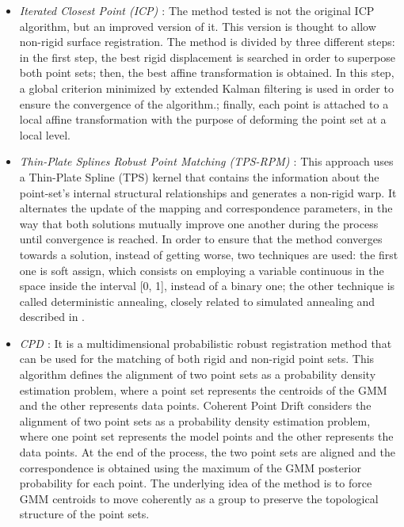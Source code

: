 \begin{itemize}
 \item \textit{Iterated Closest Point (ICP) \citep{besl1992method, feldmar1996rigid}}: The method tested 
is not the original ICP algorithm, but an improved version of it. This version is thought to allow non-rigid surface 
registration. The method is divided by three different steps: in the first step, the best rigid displacement is searched 
in order to superpose both point sets; then, the best affine transformation is obtained. In this step, a global 
criterion minimized by extended Kalman filtering is used in order to ensure the convergence of the algorithm.; finally, 
each point is attached to a local affine transformation with the purpose of deforming the point set at a local level. 
 \item \textit{Thin-Plate Splines Robust Point Matching (TPS-RPM) \citep{chui2000new}}: This approach uses a Thin-Plate Spline (TPS) kernel that contains the information about the point-set's internal structural relationships and generates a non-rigid warp.
 It alternates the update of the mapping and correspondence parameters, in the way that both solutions mutually improve one another during the process until convergence is reached. In order to ensure that the method converges towards a solution, instead of getting worse, two techniques are used: the first one is soft assign, which consists on employing a variable continuous in the space inside the interval [0, 1], instead of a binary one; the other technique is called deterministic annealing, closely related to simulated annealing and described in \cite{geiger1991parallel}.
 \item \textit{\acf{CPD} \citep{myronenko2010point}}: It is a multidimensional probabilistic robust registration method that can be used for the matching of both rigid and non-rigid point sets. This algorithm defines the alignment of two point sets as a probability density estimation problem, where a point set represents the centroids of the \ac{GMM} and the other represents data points. Coherent Point Drift considers the alignment of two point sets as a probability density estimation problem, where one point set represents the model points and the other represents the data points. At the end of the process, the two point sets are aligned and the correspondence is obtained using the maximum of the \ac{GMM} posterior probability for each point. The underlying idea of the method is to force \ac{GMM} centroids to move coherently as a group to preserve the topological structure of the point sets.

\end{itemize}
